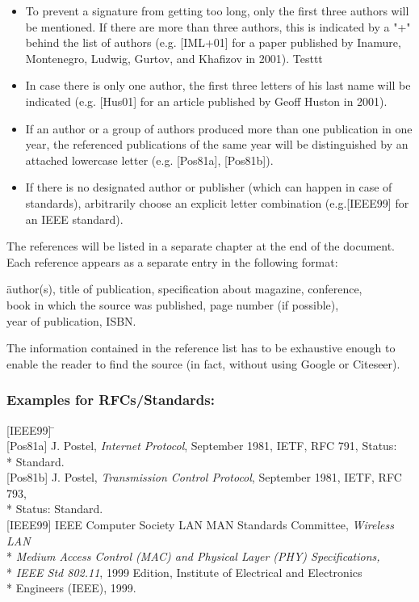 \begin{itemize}
\item To prevent a signature from getting too long, only the first
  three authors will be mentioned. If there are more than three authors,
  this is indicated by a "+" behind the list of authors
  (e.g. [IML+01] for a paper published by Inamure, Montenegro, Ludwig,
  Gurtov, and Khafizov in 2001).
  Testtt
\item In case there is only one author, the first three letters of his
  last name will be indicated (e.g. [Hus01] for an article published by
  Geoff Huston in 2001).
  
\item If an author or a group of authors produced more than one publication
  in one year, the referenced publications of the same year will be distinguished
  by an attached lowercase letter (e.g. [Pos81a], [Pos81b]).
  
\item If there is no designated author or publisher (which can happen in case
  of standards), arbitrarily choose an explicit letter combination (e.g.[IEEE99]
  for an IEEE standard).

\end{itemize}

The references will be listed in a separate chapter at the end of the document.
Each reference appears as a separate entry in the following format:

\begin{tabbing}
  [Signature] \= author(s), title of publication, specification about magazine,
  conference, \\ \> book in which the source was published, page number (if possible),\\
  \> year of publication, ISBN.
\end{tabbing}

The information contained in the reference list has to be exhaustive enough to enable
the reader to find the source (in fact, without using Google or Citeseer).


\subsubsection*{Examples for RFCs/Standards:}
\begin{tabbing}
  {}[IEEE99] \= \kill \\
  {}[Pos81a] \> J. Postel, \emph{Internet Protocol}, September 1981, IETF, RFC
  791, Status: \\*
  \> Standard.\\
  {}[Pos81b] \> J. Postel, \emph{Transmission Control Protocol}, September
  1981, IETF, RFC 793,\\*
  \> Status: Standard.\\
  {}[IEEE99] \> IEEE Computer Society LAN MAN Standards Committee,
  \emph{Wireless LAN} \\*
  \> \emph{Medium Access Control (MAC) and Physical Layer (PHY)
  Specifications,} \\*
  \> \emph{IEEE Std 802.11}, 1999 Edition, Institute of Electrical and
  Electronics\\*
  \> Engineers (IEEE), 1999.
\end{tabbing}


